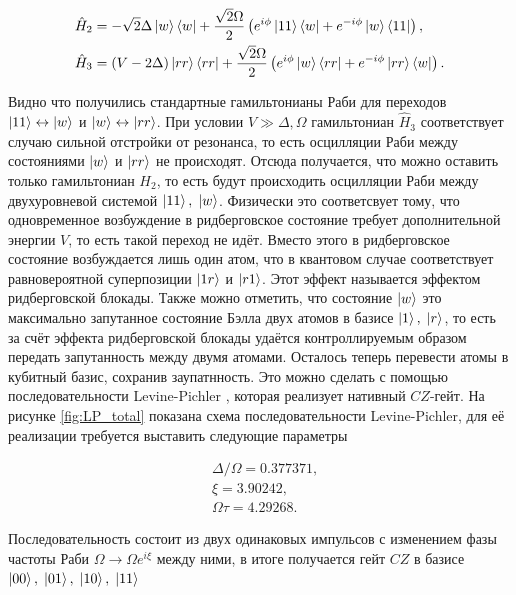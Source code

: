 \begin{equation}
	\begin{aligned}
		& \hat{H}_{2} = -\sqrt{2}\Delta \left| w \right\rangle\left\langle w \right| + \frac{\sqrt{2}\Omega}{2}\left(e^{i\phi}\left| 11 \right\rangle\left\langle w \right| +e^{-i\phi}\left| w \right\rangle\left\langle 11 \right| \right), \\
		& \hat{H}_{3} = (V-2\Delta)\left| rr \right\rangle\left\langle rr \right| + \frac{\sqrt{2}\Omega}{2}\left(e^{i\phi}\left| w \right\rangle\left\langle rr \right| +e^{-i\phi}\left| rr \right\rangle\left\langle w \right| \right).
	\end{aligned}
\end{equation}

Видно что получились стандартные гамильтонианы Раби для переходов $\left| 11 \right\rangle \leftrightarrow \left| w \right\rangle$ и $\left| w \right\rangle \leftrightarrow \left| rr \right\rangle$. При условии $V \gg \Delta, \Omega$ гамильтониан $\hat{H}_3$ соответствует случаю сильной отстройки от резонанса, то есть осцилляции Раби между состояниями $\left| w \right\rangle$ и $\left| rr \right\rangle$ не происходят. Отсюда получается, что можно оставить только гамильтониан $H_2$, то есть будут происходить осцилляции Раби между двухуровневой системой $\left| 11 \right\rangle, \; \left| w \right\rangle$. Физически это соответсвует тому, что одновременное возбуждение в ридберговское состояние требует дополнительной энергии $V$, то есть такой переход не идёт. Вместо этого в ридберговское состояние возбуждается лишь один атом, что в квантовом случае соответствует равновероятной суперпозиции $\left| 1r \right\rangle$ и $\left| r1 \right\rangle$. Этот эффект называется эффектом ридберговской блокады. Также можно отметить, что состояние $\left| w \right\rangle$ это максимально запутанное состояние Бэлла двух атомов в базисе $\left| 1 \right\rangle, \; \left| r \right\rangle$, то есть за счёт эффекта ридберговской блокады удаётся контроллируемым образом передать запутанность между двумя атомами. Осталось теперь перевести атомы в кубитный базис, сохранив заупатнность. Это можно сделать с помощью последовательности Levine-Pichler \cite{toffoli}, которая реализует нативный $CZ$-гейт. На рисунке \ref{fig:LP_total} показана схема последовательности Levine-Pichler, для её реализации требуется выставить следующие параметры \cite{toffoli}

\begin{equation}
	\begin{aligned}
		& \Delta/\Omega = 0.377371, \\
		& \xi = 3.90242, \\
		& \Omega \tau = 4.29268.
	\end{aligned}
\end{equation}

Последовательность состоит из двух одинаковых импульсов с изменением фазы частоты Раби $\Omega \rightarrow \Omega e^{i\xi}$ между ними, в итоге получается гейт $CZ$ в базисе $\left| 00 \right\rangle, \; \left| 01 \right\rangle, \; \left| 10 \right\rangle, \; \left| 11 \right\rangle$ 

